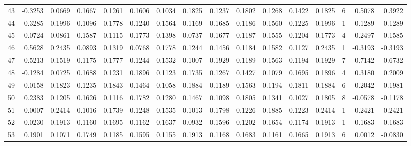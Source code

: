 \begin{tabular}{lrrrrrrrrrrrrrrr}
43  &     -0.3253 &  0.0669 &  0.1667 &  0.1261 &  0.1606 &  0.1034 &  0.1825 &  0.1237 &  0.1802 &  0.1268 &   0.1422 &     0.1825 &      6 &                    0.5078 &                     0.3922 \\
44  &      0.3285 &  0.1996 &  0.1096 &  0.1778 &  0.1240 &  0.1564 &  0.1169 &  0.1685 &  0.1186 &  0.1560 &   0.1225 &     0.1996 &      1 &                   -0.1289 &                    -0.1289 \\
45  &     -0.0724 &  0.0861 &  0.1587 &  0.1115 &  0.1773 &  0.1398 &  0.0737 &  0.1677 &  0.1187 &  0.1555 &   0.1204 &     0.1773 &      4 &                    0.2497 &                     0.1585 \\
46  &      0.5628 &  0.2435 &  0.0893 &  0.1319 &  0.0768 &  0.1778 &  0.1244 &  0.1456 &  0.1184 &  0.1582 &   0.1127 &     0.2435 &      1 &                   -0.3193 &                    -0.3193 \\
47  &     -0.5213 &  0.1519 &  0.1175 &  0.1777 &  0.1244 &  0.1532 &  0.1007 &  0.1929 &  0.1189 &  0.1563 &   0.1194 &     0.1929 &      7 &                    0.7142 &                     0.6732 \\
48  &     -0.1284 &  0.0725 &  0.1688 &  0.1231 &  0.1896 &  0.1123 &  0.1735 &  0.1267 &  0.1427 &  0.1079 &   0.1695 &     0.1896 &      4 &                    0.3180 &                     0.2009 \\
49  &     -0.0158 &  0.1823 &  0.1235 &  0.1843 &  0.1464 &  0.1058 &  0.1884 &  0.1189 &  0.1563 &  0.1194 &   0.1811 &     0.1884 &      6 &                    0.2042 &                     0.1981 \\
50  &      0.2383 &  0.1205 &  0.1626 &  0.1116 &  0.1782 &  0.1280 &  0.1467 &  0.1098 &  0.1805 &  0.1341 &   0.1027 &     0.1805 &      8 &                   -0.0578 &                    -0.1178 \\
51  &     -0.0007 &  0.2414 &  0.1016 &  0.1739 &  0.1248 &  0.1535 &  0.1013 &  0.1798 &  0.1226 &  0.1885 &   0.1223 &     0.2414 &      1 &                    0.2421 &                     0.2421 \\
52  &      0.0230 &  0.1913 &  0.1160 &  0.1695 &  0.1162 &  0.1637 &  0.0932 &  0.1596 &  0.1202 &  0.1654 &   0.1174 &     0.1913 &      1 &                    0.1683 &                     0.1683 \\
53  &      0.1901 &  0.1071 &  0.1749 &  0.1185 &  0.1595 &  0.1155 &  0.1913 &  0.1168 &  0.1683 &  0.1161 &   0.1665 &     0.1913 &      6 &                    0.0012 &                    -0.0830 \\

\end{tabular}
